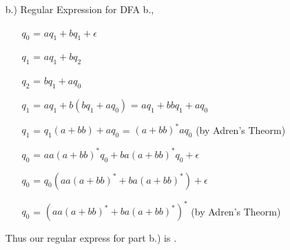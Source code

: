 \documentclass[12pt]{article}
\begin{document}
\begin{enumerate}
\begin{itemize}
			\item[b.)] Regular Expression for DFA b., 
				\begin{itemize}
					\item[] $q_0$ = $aq_1 + bq_1 + \epsilon$
					\item[] $q_1$ = $aq_1 + bq_2$ 
					\item[] $q_2$ = $bq_1 + aq_0$ 
					\item[] $q_1$ = $aq_1 + b(bq_1 + aq_0)$ = $aq_1 + bbq_1 + aq_0$
					\item[] $q_1$ = $q_1(a + bb) + aq_0$ = $(a+bb)^*aq_0$ \tabto{9cm} (by Adren's Theorm)
					\item[] $q_0$ = $aa(a+bb)^*q_0 + ba(a+bb)^*q_0 + \epsilon$
					\item[] $q_0$ = $q_0(aa(a+bb)^* + ba(a+bb)^*) + \epsilon$
					\item[] $q_0$ = $(aa(a+bb)^* + ba(a+bb)^*)^*$ \tabto{9cm} (by Adren's Theorm)
				\end{itemize}
				Thus our regular express for part b.) is .
		\end{itemize}

\end{enumerate}
\end{document}
